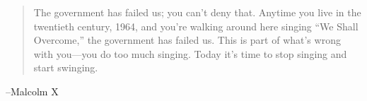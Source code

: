 \documentclass{exam}
\begin{document}
  \else
    \vspace{10 cm}
    \begin{quote}
      \begin{em}
        The government has failed us; you can't deny that. Anytime you live in
        the twentieth century, 1964, and you're walking around here singing
        ``We Shall Overcome,'' the government has failed us. This is part of
        what's wrong with you---you do too much singing.  Today it's time to
        stop singing and start swinging. 
        
      \end{em}
    \end{quote}
    \hspace{1 cm} --Malcolm X
  \fi
\end{document}
